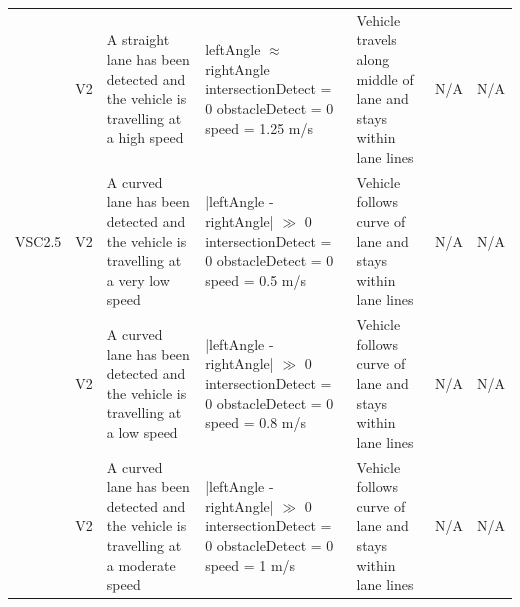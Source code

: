 \documentclass [10pt]{article}
\begin{document}
\begin{longtable}{ | p{ } | p{ } |  p{ } |  p{ } | p{ } | p{ } |  p{ } |}
    \rowcolor{tableCell}\multicolumn{1}{|c|}{VSC2.4} 
    & \multicolumn{1}{c|}{V2}
    & A straight lane has been detected and the vehicle is travelling at a high speed
    & leftAngle $\approx$ rightAngle \newline
    intersectionDetect = 0 \newline
    obstacleDetect = 0 \newline
    speed = 1.25 m/s
    & Vehicle travels along middle of lane and stays within lane lines
    & N/A 
    & \multicolumn{1}{c|}{N/A}\\ 
    
    \multicolumn{1}{|c|}{VSC2.5} 
    & \multicolumn{1}{c|}{V2}
    & A curved lane has been detected and the vehicle is travelling at a very low speed
    & |leftAngle - rightAngle| $\gg$ 0 \newline
    intersectionDetect = 0 \newline
    obstacleDetect = 0 \newline
    speed = 0.5 m/s
    & Vehicle follows curve of lane and stays within lane lines
    & N/A
    & \multicolumn{1}{c|}{N/A}\\ 
    
    \rowcolor{tableCell}\multicolumn{1}{|c|}{VSC2.6} 
    & \multicolumn{1}{c|}{V2}
    & A curved lane has been detected and the vehicle is travelling at a low speed
     & |leftAngle - rightAngle| $\gg$ 0 \newline
    intersectionDetect = 0 \newline
    obstacleDetect = 0 \newline
    speed = 0.8 m/s
    & Vehicle follows curve of lane and stays within lane lines
    & N/A
    & \multicolumn{1}{c|}{N/A}\\ \hline
    
     \newpage \hline
     
     
    \multicolumn{1}{|c|}{VSC2.7} 
    & \multicolumn{1}{c|}{V2}
    & A curved lane has been detected and the vehicle is travelling at a moderate speed
     & |leftAngle - rightAngle| $\gg$ 0 \newline
    intersectionDetect = 0 \newline
    obstacleDetect = 0 \newline
    speed = 1 m/s
    & Vehicle follows curve of lane and stays within lane lines
    & N/A 
    & \multicolumn{1}{c|}{N/A}\\ 
    
   
    

\end{longtable}
\end{document}
